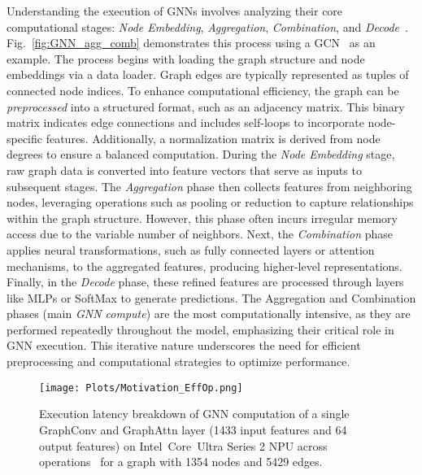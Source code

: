 Understanding the execution of GNNs involves analyzing their core computational stages: \textit{Node Embedding}, \textit{Aggregation}, \textit{Combination}, and \textit{Decode}~\cite{raha_book_chapter}. Fig.~\ref{fig:GNN_agg_comb} demonstrates this process using a GCN~\cite{gcn} as an example.
The process begins with loading the graph structure and node embeddings via a data loader. Graph edges are typically represented as tuples of connected node indices. To enhance computational efficiency, the graph can be \textit{preprocessed} into a structured format, such as an adjacency matrix. This binary matrix indicates edge connections and includes self-loops to incorporate node-specific features. Additionally, a normalization matrix is derived from node degrees to ensure a balanced computation.
During the \textit{Node Embedding} stage, raw graph data is converted into feature vectors that serve as inputs to subsequent stages. The \textit{Aggregation} phase then collects features from neighboring nodes, leveraging operations such as pooling or reduction to capture relationships within the graph structure. However, this phase often incurs irregular memory access due to the variable number of neighbors. Next, the \textit{Combination} phase applies neural transformations, such as fully connected layers or attention mechanisms, to the aggregated features, producing higher-level representations. Finally, in the \textit{Decode} phase, these refined features are processed through layers like MLPs or SoftMax to generate predictions.
The Aggregation and Combination phases (main \textit{GNN compute}) are the most computationally intensive, as they are performed repeatedly throughout the model, emphasizing their critical role in GNN execution. This iterative nature underscores the need for efficient preprocessing and computational strategies to optimize performance.

\begin{figure}[t!]
\begin{center}
\texttt{[image: Plots/Motivation\_EffOp.png]}%
\end{center}
\caption{Execution latency breakdown of GNN computation of a single GraphConv and GraphAttn layer (1433 input features and 64 output features) on Intel\textregistered\ Core\texttrademark\ Ultra Series 2 NPU across operations~\cite{openvino_ops} for a graph with 1354 nodes and 5429 edges.}\label{fig:motivation_effop_grax}
\end{figure}

